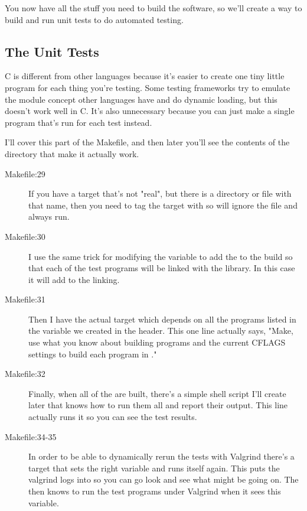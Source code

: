 You now have all the stuff you need to build the software, so we'll create a
way to build and run unit tests to do automated testing.

\subsection{The Unit Tests}

C is different from other languages because it's easier to create one tiny little
program for each thing you're testing.  Some testing frameworks try to emulate
the module concept other languages have and do dynamic loading, but this doesn't
work well in C.  It's also unnecessary because you can just make a single program
that's run for each test instead.

I'll cover this part of the Makefile, and then later you'll see the contents of
the  directory that make it actually work.

\begin{description}
\item[Makefile:29] If you have a target that's not "real", but there is a directory
    or file with that name, then you need to tag the target with 
    so  will ignore the file and always run.
\item[Makefile:30] I use the same trick for modifying the  variable
    to add the  to the build so that each of the test programs
    will be linked with the  library.  In this case it will add
     to the linking.
\item[Makefile:31] Then I have the actual  target which depends 
    on all the programs listed in the  variable we created 
    in the header.  This one line actually says, "Make, use what you know
    about building programs and the current CFLAGS settings to build each
    program in ."
\item[Makefile:32] Finally, when all of the  are built, there's
    a simple shell script I'll create later that knows how to run them all
    and report their output.  This line actually runs it so you can see
    the test results.
\item[Makefile:34-35] In order to be able to dynamically rerun the tests 
    with Valgrind there's a  target that sets the right
    variable and runs itself again.  This puts the valgrind logs into
     so you can go look and see what might be
    going on.  The  then knows to run the
    test programs under Valgrind when it sees this  variable.
\end{description}

